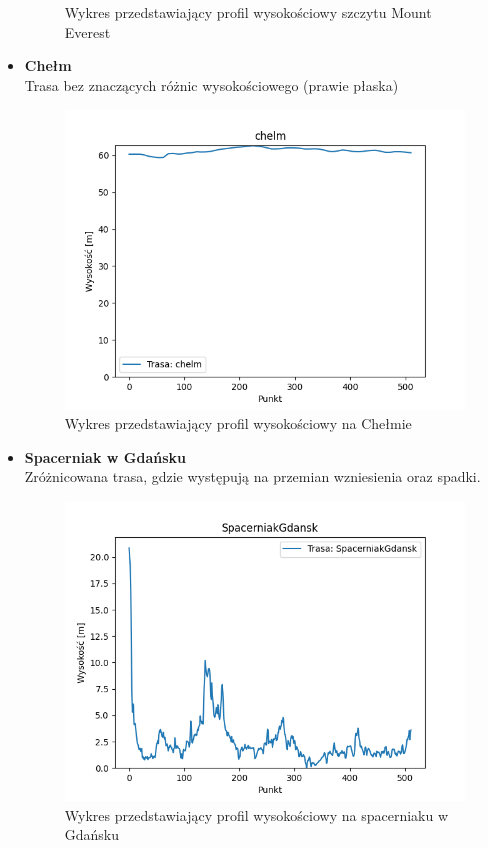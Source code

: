 \documentclass[12pt]{extarticle}
\begin{document}
\begin{itemize}
\begin{figure}[H]
        \caption{Wykres przedstawiający profil wysokościowy szczytu Mount Everest}
    \end{figure}
    \item \textbf{Chełm}\\
    Trasa bez znaczących różnic wysokościowego (prawie płaska)
    \begin{figure}[H]
        \centering
        \includegraphics[scale=0.8]{chelm.png}
        \caption{Wykres przedstawiający profil wysokościowy na Chełmie}
    \end{figure}
    \item \textbf{Spacerniak w Gdańsku}\\
    Zróżnicowana trasa, gdzie występują na przemian wzniesienia oraz spadki.
    \begin{figure}[H]
        \centering
        \includegraphics[scale=0.8]{SpacerniakGdansk.png}
        \caption{Wykres przedstawiający profil wysokościowy na spacerniaku w Gdańsku}
    \end{figure}
\end{itemize}
\end{document}
